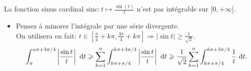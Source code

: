 \begin{tcolorbox}
    La fonction sinus cardinal $\mathrm{sinc}:t \mapsto \frac{\sin(t)}{t}$ n'est pas intégrable sur $]0, +\infty[$.
\end{tcolorbox}
    
\begin{itemize}
    \item Pensez à minorer l'intégrale par une série divergente.\\
    On utilisera en fait: $t \in \left[ \frac{\pi}{4} + k\pi, \frac{3 \pi}{4} + k \pi \right] \Rightarrow |\sin t| \geqslant \frac{1}{\sqrt{2}}$.
    $$\int_{\pi}^{n \pi + 3 \pi/4} \left| \frac{\sin t}{t} \right|\ \mathrm{d} t \geqslant \sum_{k=1}^{n} \int_{k \pi + \pi/4}^{k \pi + 3 \pi/4} \left| \frac{\sin t}{t} \right|\ \mathrm{d} t \geqslant \frac{1}{\sqrt{2}} \sum_{k=1}^{n} \int_{k \pi + \pi/4}^{k \pi + 3 \pi/4} \frac{1}{t}\ \mathrm{d} t.$$
\end{itemize}